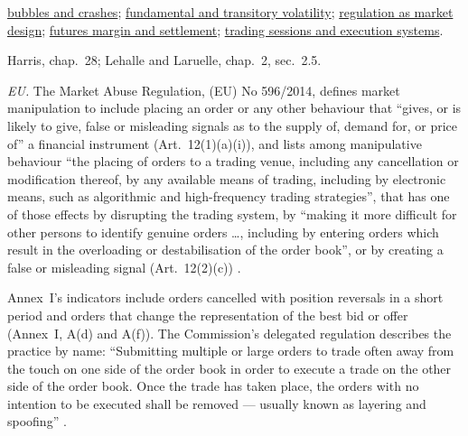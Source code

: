 \begin{qfmechanism}
 \hyperref[mech:bubble-crash-dynamics]{bubbles and crashes}; \hyperref[def:volatility-components]{fundamental and transitory volatility}; \hyperref[def:market-regulation-design]{regulation as market design}; \hyperref[mech:futures-margin-settlement]{futures margin and settlement}; \hyperref[def:trading-sessions-execution-systems]{trading sessions and execution systems}.

 Harris, chap.~28; Lehalle and Laruelle, chap.~2, sec.~2.5.

\end{qfmechanism}

\begin{qfrule}\label{rule:spoofing-securities-markets}
 \emph{EU.} The Market Abuse Regulation, (EU) No 596/2014, defines market manipulation to include placing an order or any other behaviour that ``gives, or is likely to give, false or misleading signals as to the supply of, demand for, or price of'' a financial instrument (Art.~12(1)(a)(i)), and lists among manipulative behaviour ``the placing of orders to a trading venue, including any cancellation or modification thereof, by any available means of trading, including by electronic means, such as algorithmic and high-frequency trading strategies'', that has one of those effects by disrupting the trading system, by ``making it more difficult for other persons to identify genuine orders \dots, including by entering orders which result in the overloading or destabilisation of the order book'', or by creating a false or misleading signal (Art.~12(2)(c)) \citep[Art.~12]{eu-mar-596-2014}.

Annex~I's indicators include orders cancelled with position reversals in a short period and orders that change the representation of the best bid or offer (Annex~I, A(d) and A(f)). The Commission's delegated regulation describes the practice by name: ``Submitting multiple or large orders to trade often away from the touch on one side of the order book in order to execute a trade on the other side of the order book. Once the trade has taken place, the orders with no intention to be executed shall be removed — usually known as layering and spoofing'' \citep[Annex~II, sec.~1, point~5(e)]{eu-2016-522}.


\end{qfrule}
